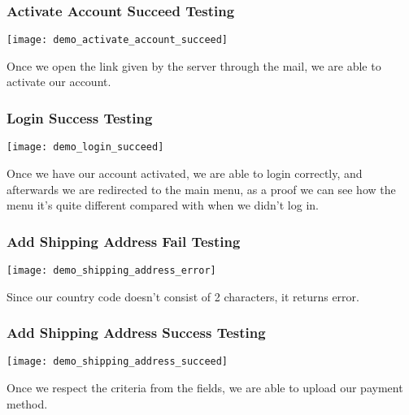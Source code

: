 \subsubsection[Activate Account Succeed Testing]{Activate Account Succeed Testing}
\begin{center}
    \texttt{[image: demo\_activate\_account\_succeed]}
\end{center}
\begin{flushleft}
    Once we open the link given by the server through the mail, we are able to activate our account.
\end{flushleft}

\subsubsection[Login Success Testing]{Login Success Testing}
\begin{center}
    \texttt{[image: demo\_login\_succeed]}
\end{center}
\begin{flushleft}
    Once we have our account activated, we are able to login correctly, and afterwards we are redirected to the main
    menu, as a proof we can see how the menu it's quite different compared with when we didn't log in.
\end{flushleft}

\subsubsection[Add Shipping Address Fail Testing ]{Add Shipping Address Fail Testing}
\begin{center}
    \texttt{[image: demo\_shipping\_address\_error]}
\end{center}
\begin{flushleft}
    Since our country code doesn't consist of 2 characters, it returns error.
\end{flushleft}

\subsubsection[Add Shipping Address Success Testing ]{Add Shipping Address Success Testing}
\begin{center}
    \texttt{[image: demo\_shipping\_address\_succeed]}
\end{center}
\begin{flushleft}
    Once we respect the criteria from the fields, we are able to upload our payment method.
\end{flushleft}

